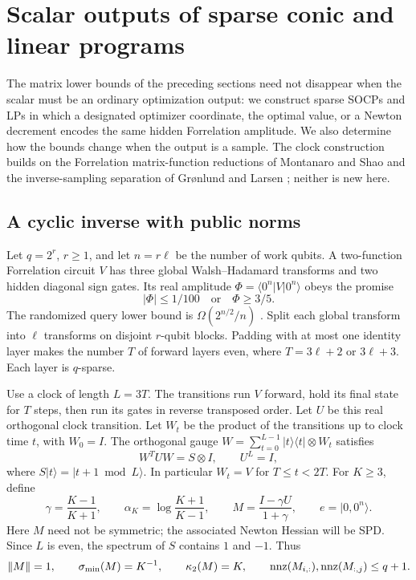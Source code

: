 \section{Scalar outputs of sparse conic and linear programs}\label{sec:realizations}

The matrix lower bounds of the preceding sections need not disappear
when the scalar must be an ordinary optimization output: we construct sparse SOCPs
and LPs in which a designated optimizer coordinate, the optimal value, or
a Newton decrement encodes the same hidden Forrelation amplitude.  We also
determine how the bounds change when the output is a sample.  The clock construction builds on the Forrelation
matrix-function reductions of Montanaro and Shao \citep{MontanaroShao2023}
and the inverse-sampling separation of Gr\o nlund and Larsen
\citep{GronlundLarsen2025}; neither is new here.

\subsection{A cyclic inverse with public norms}

Let $q=2^r$, $r\geq1$, and let $n=r\ell$ be the number of work qubits.
A two-function Forrelation circuit $V$ has three global Walsh--Hadamard
transforms and two hidden diagonal sign gates.  Its real amplitude
$\Phi=\langle0^n|V|0^n\rangle$ obeys the promise
\[
 |\Phi|\leq1/100\quad\text{or}\quad\Phi\geq3/5.
\]
The randomized query lower bound is
$\Omega(2^{n/2}/n)$ \citep{AaronsonAmbainis2018}.
Split each global transform into $\ell$ transforms on disjoint $r$-qubit
blocks.  Padding with at most one identity layer makes the number $T$ of
forward layers even, where $T=3\ell+2$ or $3\ell+3$.  Each layer is $q$-sparse.

Use a clock of length $L=3T$.  The transitions run $V$ forward, hold its
final state for $T$ steps, then run its gates in reverse transposed order.
Let $U$ be this real orthogonal clock transition.  Let $W_t$ be the
product of the transitions up to clock time $t$, with $W_0=I$.  The
orthogonal gauge
$W=\sum_{t=0}^{L-1}|t\rangle\langle t|\otimes W_t$ satisfies
\begin{equation}\label{eq:history-gauge}
 W^TUW=S\otimes I,\qquad U^L=I,
\end{equation}
where $S|t\rangle=|t+1\bmod L\rangle$.  In particular $W_t=V$ for
$T\leq t<2T$.  For $K\geq3$, define
\begin{equation}\label{eq:cyclic-M}
 \gamma=\frac{K-1}{K+1},\qquad
 \alpha_K=\log\frac{K+1}{K-1},\qquad
 M=\frac{I-\gamma U}{1+\gamma},\qquad e=|0,0^n\rangle.
\end{equation}
Here $M$ need not be symmetric; the associated Newton Hessian will be SPD.
Since $L$ is even, the spectrum of $S$ contains $1$ and
$-1$.  Thus
\begin{equation}\label{eq:cyclic-spectrum}
 \left\lVert M\right\rVert=1,\qquad \sigma_{\min}(M)=K^{-1},\qquad
 \kappa_2(M)=K,\qquad \operatorname{nnz}(M_{i,:}),\operatorname{nnz}(M_{:,j})\leq q+1.
\end{equation}

